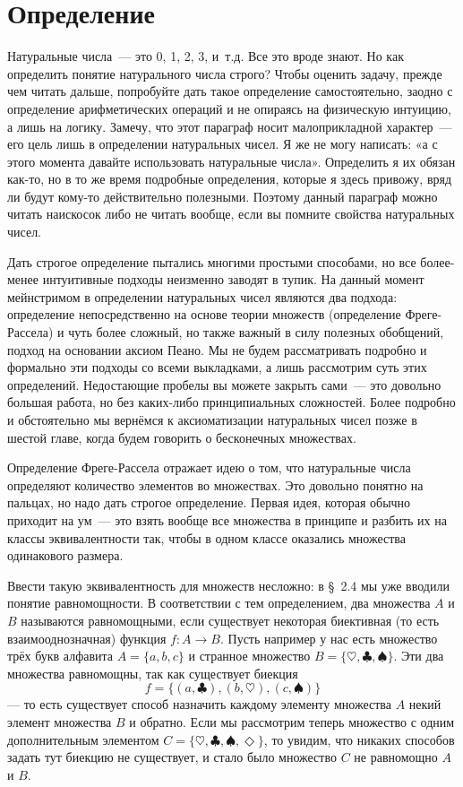 \section{Определение}

Натуральные числа~— это 0, 1, 2, 3, и~т.д. Все это вроде знают. Но как определить понятие натурального числа строго? Чтобы оценить задачу, прежде чем читать дальше, попробуйте дать такое определение самостоятельно, заодно с определение арифметических операций и не опираясь на физическую интуицию, а лишь на логику. Замечу, что этот параграф носит малоприкладной характер~— его цель лишь в определении натуральных чисел. Я же не могу написать: «а с этого момента давайте использовать натуральные числа». Определить я их обязан как-то, но в то же время подробные определения, которые я здесь привожу, вряд ли будут кому-то действительно полезными. Поэтому данный параграф можно читать наискосок либо не читать вообще, если вы помните свойства натуральных чисел.

Дать строгое определение пытались многими простыми способами, но все более-менее интуитивные подходы неизменно заводят в тупик. На данный момент мейнстримом в определении натуральных чисел являются два подхода: определение непосредственно на основе теории множеств (определение Фреге-Рассела) и чуть более сложный, но также важный в силу полезных обобщений, подход на основании аксиом Пеано. Мы не будем рассматривать подробно и формально эти подходы со всеми выкладками, а лишь рассмотрим суть этих определений. Недостающие пробелы вы можете закрыть сами~— это довольно большая работа, но без каких-либо принципиальных сложностей. Более подробно и обстоятельно мы вернёмся к аксиоматизации натуральных чисел позже в шестой главе, когда будем говорить о бесконечных множествах.

Определение Фреге-Рассела отражает идею о том, что натуральные числа определяют количество элементов во множествах. Это довольно понятно на пальцах, но надо дать строгое определение. Первая идея, которая обычно приходит на ум~— это взять вообще все множества в принципе и разбить их на классы эквивалентности так, чтобы в одном классе оказались множества одинакового размера.

Ввести такую эквивалентность для множеств несложно: в \S~2.4 мы уже вводили понятие равномощности. В соответствии с тем определением, два множества $A$ и $B$ называются равномощными, если существует некоторая биективная (то есть взаимооднозначная) функция $f:A\to B$. Пусть например у нас есть множество трёх букв алфавита $A=\{a, b, c\}$ и странное множество $B=\{\heartsuit, \clubsuit, \spadesuit\}$. Эти два множества равномощны, так как существует биекция $$f=\{(a, \clubsuit), (b, \heartsuit), (c, \spadesuit)\}$$ — то есть существует способ назначить каждому элементу множества $A$ некий элемент множества $B$ и обратно. Если мы рассмотрим теперь множество с одним дополнительным элементом $C=\{\heartsuit, \clubsuit, \spadesuit, \Diamond\}$, то увидим, что никаких способов задать тут биекцию не существует, и стало было множество $C$ не равномощно $A$ и $B$.

